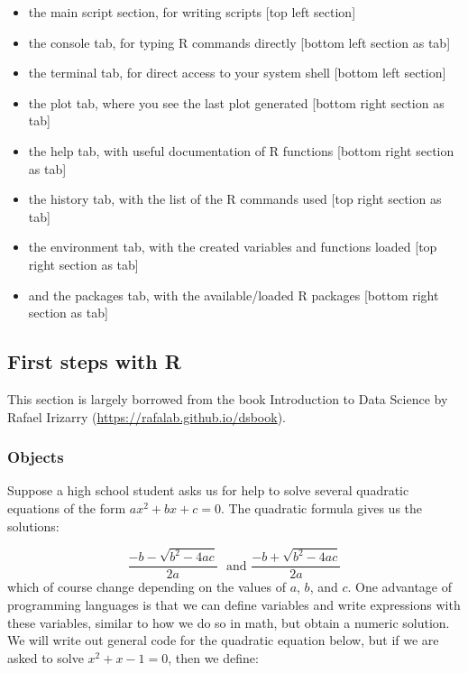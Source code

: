 \documentclass[
]{article}
\providecommand{\tightlist}{%
  \setlength{\itemsep}{0pt}\setlength{\parskip}{0pt}}
\begin{document}
\begin{itemize}
\tightlist
\item
  the main script section, for writing scripts {[}top left section{]}
\item
  the console tab, for typing R commands directly {[}bottom left section
  as tab{]}
\item
  the terminal tab, for direct access to your system shell {[}bottom
  left section{]}
\item
  the plot tab, where you see the last plot generated {[}bottom right
  section as tab{]}
\item
  the help tab, with useful documentation of R functions {[}bottom right
  section as tab{]}
\item
  the history tab, with the list of the R commands used {[}top right
  section as tab{]}
\item
  the environment tab, with the created variables and functions loaded
  {[}top right section as tab{]}
\item
  and the packages tab, with the available/loaded R packages {[}bottom
  right section as tab{]}
\end{itemize}

\subsection{First steps with R}\label{first-steps-with-r}

This section is largely borrowed from the book Introduction to Data
Science by Rafael Irizarry (\url{https://rafalab.github.io/dsbook}).

\subsubsection{Objects}\label{objects}

Suppose a high school student asks us for help to solve several
quadratic equations of the form \(ax^2+bx+c = 0\). The quadratic formula
gives us the solutions:

\[
\frac{-b - \sqrt{b^2 - 4ac}}{2a}\,\, \mbox{ and } \frac{-b + \sqrt{b^2 - 4ac}}{2a}
\] which of course change depending on the values of \(a\), \(b\), and
\(c\). One advantage of programming languages is that we can define
variables and write expressions with these variables, similar to how we
do so in math, but obtain a numeric solution. We will write out general
code for the quadratic equation below, but if we are asked to solve
\(x^2 + x -1 = 0\), then we define:
\end{document}
